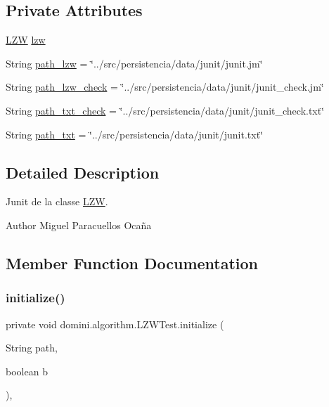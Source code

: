 \subsection*{Private Attributes}
\begin{DoxyCompactItemize}
\item 
\hyperlink{classdomini_1_1algorithm_1_1LZW}{L\+ZW} \hyperlink{classdomini_1_1algorithm_1_1LZWTest_a591c1bb9b927631d0e60a2853e502d20}{lzw}
\item 
String \hyperlink{classdomini_1_1algorithm_1_1LZWTest_af5091e6df88845c585e92165f2fae2dc}{path\+\_\+lzw} = \char`\"{}../src/persistencia/data/junit/junit.\+jm\char`\"{}
\item 
String \hyperlink{classdomini_1_1algorithm_1_1LZWTest_a25a37b8cd7cb0756531c39e7ebc60db0}{path\+\_\+lzw\+\_\+check} = \char`\"{}../src/persistencia/data/junit/junit\+\_\+check.\+jm\char`\"{}
\item 
String \hyperlink{classdomini_1_1algorithm_1_1LZWTest_add9dbf2d86413bf9f7bcdd23b268c288}{path\+\_\+txt\+\_\+check} = \char`\"{}../src/persistencia/data/junit/junit\+\_\+check.\+txt\char`\"{}
\item 
String \hyperlink{classdomini_1_1algorithm_1_1LZWTest_a4194ade234060b69729a0380ff4ae33d}{path\+\_\+txt} = \char`\"{}../src/persistencia/data/junit/junit.\+txt\char`\"{}
\end{DoxyCompactItemize}


\subsection{Detailed Description}
Junit de la classe \hyperlink{classdomini_1_1algorithm_1_1LZW}{L\+ZW}. 

\begin{DoxyAuthor}{Author}
Miguel Paracuellos Ocaña 
\end{DoxyAuthor}


\subsection{Member Function Documentation}
\mbox{\label{classdomini_1_1algorithm_1_1LZWTest_acf4cac88aafa2144dc8ce3a80453fa90}} 
\subsubsection{\texorpdfstring{initialize()}{initialize()}}
{\footnotesize\ttfamily private void domini.\+algorithm.\+L\+Z\+W\+Test.\+initialize (\begin{DoxyParamCaption}\item[{String}]{path,  }\item[{boolean}]{b }\end{DoxyParamCaption})\hspace{0.3cm}{\ttfamily [inline]}, {\ttfamily [private]}}



